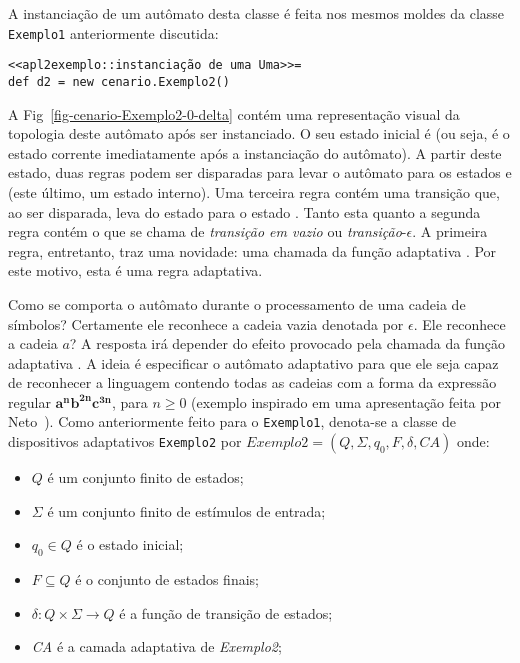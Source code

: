 \noindent
A instanciação de um autômato desta classe é feita nos mesmos moldes da classe \lstinline|Exemplo1| anteriormente discutida:

\begin{lstlisting}
<<apl2exemplo::instanciação de uma Uma>>=
def d2 = new cenario.Exemplo2()
\end{lstlisting}

\noindent
A Fig~\ref{fig-cenario-Exemplo2-0-delta} contém uma representação visual da topologia deste autômato após ser instanciado. O seu estado inicial é  (ou seja, é o estado corrente imediatamente após a instanciação do autômato). A partir deste estado, duas regras podem ser disparadas para levar o autômato para os estados  e  (este último, um estado interno). Uma terceira regra contém uma transição que, ao ser disparada, leva  do estado  para o estado . Tanto esta quanto a segunda regra contém o que se chama de \textit{transição em vazio} ou \textit{transição}-$\epsilon$. A primeira regra, entretanto, traz uma novidade: uma chamada da função adaptativa . Por este motivo, esta é uma regra adaptativa.


Como se comporta o autômato  durante o processamento de uma cadeia de símbolos? Certamente ele reconhece a cadeia vazia denotada por $\epsilon$. Ele reconhece a cadeia $a$? A resposta irá depender do efeito provocado pela chamada da função adaptativa . A ideia é especificar o autômato adaptativo para que ele seja capaz de reconhecer a linguagem contendo todas as cadeias com a forma da expressão regular $\mathbf{a^nb^{2n}c^{3n}}$, para $n \geq 0$ (exemplo inspirado em uma apresentação feita por Neto~\cite{neto:2008}). Como anteriormente feito para o \lstinline|Exemplo1|, denota-se a classe de dispositivos adaptativos \lstinline|Exemplo2| por $\textit{Exemplo2}=(Q, \Sigma, q_0, F, \delta, \textit{CA})$ onde:

\begin{itemize}
\item $Q$ é um conjunto finito de estados;
\item $\Sigma$ é um conjunto finito de estímulos de entrada;
\item $q_0 \in Q$ é o estado inicial;
\item $F\subseteq Q$ é o conjunto de estados finais;
\item $\delta:Q\times\Sigma \rightarrow Q$ é a função de transição de estados;
\item \textit{CA} é a camada adaptativa de \textit{Exemplo2};
\end{itemize}

